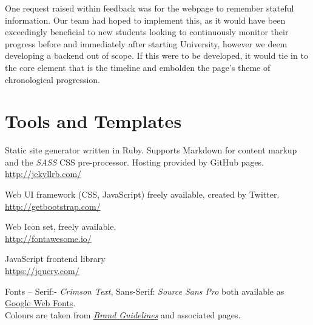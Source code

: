 \documentclass[a4paper, notoc]{tufte-handout}
\let\origdescription\description
\renewenvironment{description}{
  \setlength{\leftmargini}{1.5em}
  \origdescription
  \setlength{\itemindent}{-1.5em}
  \setlength{\labelsep}{\textwidth}
}
{\endlist}
\begin{document}
One request raised within feedback was for the webpage to remember stateful information. Our team had hoped to implement this, as it would have been exceedingly beneficial to new students looking to continuously monitor their progress before and immediately after starting University, however we deem developing a backend out of scope. If this were to be developed, it would tie in to the core element that is the timeline and embolden the page's theme of chronological progression.


\section{Tools and Templates}


\begin{description}

\item[Jekyll]
Static site generator written in Ruby. Supports Markdown for 
content markup and the \textit{SASS} CSS pre-processor.
Hosting provided by GitHub pages.
\\
\href{http://jekyllrb.com/}{http://jekyllrb.com/}

\item[BootStrap]
Web UI framework (CSS, JavaScript) freely available, created by Twitter.
\\
\href{http://getbootstrap.com/}{http://getbootstrap.com/}

\item[FontAwesome]
Web Icon set, freely available.
\\
\href{http://fontawesome.io/}{http://fontawesome.io/}


\item[JQuery]
JavaScript frontend library
\\
\href{https://jquery.com/}{https://jquery.com/}

\item[University of Edinburgh Style Guide]
Fonts -- Serif:- \textit{Crimson Text}, Sans-Serif: \textit{Source Sans Pro} both 
available as \href{https://fonts.google.com/}{Google Web Fonts}.
\\
Colours are taken from 
\href{http://www.ed.ac.uk/communications-marketing/resources}{\textit{Brand Guidelines}} 
and associated pages.
\\



\end{description}
\end{document}
